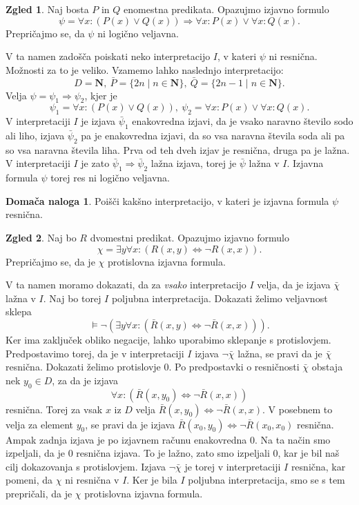 \documentclass[11pt]{book}
\def\NN{\mathbf{N}}
\theoremstyle{definition}
\theoremstyle{zgled}
\newtheorem*{zgled}{Zgled}
\theoremstyle{odprtproblem}
\theoremstyle{domacanaloga}
\newtheorem*{domacanaloga}{Domača naloga}
\theoremstyle{izrek}
\begin{document}
\begin{zgled}
Naj bosta $P$ in $Q$ enomestna predikata. Opazujmo izjavno formulo
\[
    \psi = \forall x \colon (P(x) \lor Q(x)) \Rightarrow \forall x \colon P(x) \lor \forall x \colon Q(x).
\]
Prepričajmo se, da $\psi$ ni logično veljavna.

V ta namen zadošča poiskati neko interpretacijo $I$, v kateri $\psi$ ni resnična. Možnosti za to je veliko. Vzamemo lahko naslednjo interpretacijo:
\[
    D = \NN, \ \bar P = \{ 2 n \mid n \in \NN \}, \ \bar Q = \{ 2n - 1 \mid n \in \NN \}.
\]
Velja $\psi = \psi_1 \Rightarrow \psi_2$, kjer je 
\[
    \psi_1 = \forall x \colon (P(x) \lor Q(x)), \
    \psi_2 = \forall x \colon P(x) \lor \forall x \colon Q(x).
\]
V interpretaciji $I$ je izjava $\bar \psi_1$ enakovredna izjavi, da je vsako naravno število sodo ali liho, izjava $\bar \psi_2$ pa je enakovredna izjavi, da so vsa naravna števila soda ali pa so vsa naravna števila liha. Prva od teh dveh izjav je resnična, druga pa je lažna. V interpretaciji $I$ je zato $\bar \psi_1 \Rightarrow \bar \psi_2$ lažna izjava, torej je $\bar\psi$ lažna v $I$. Izjavna formula $\psi$ torej res ni logično veljavna.

\begin{domacanaloga}
    Poišči kakšno interpretacijo, v kateri je izjavna formula $\psi$ resnična.
\end{domacanaloga}
\end{zgled}

\begin{zgled}
Naj bo $R$ dvomestni predikat. Opazujmo izjavno formulo
\[
    \chi = \exists y \forall x \colon (R(x,y) \Leftrightarrow \lnot R(x,x)).
\]
Prepričajmo se, da je $\chi$ protislovna izjavna formula.

V ta namen moramo dokazati, da za \emph{vsako} interpretacijo $I$ velja, da je izjava $\bar \chi$ lažna v $I$. Naj bo torej $I$ poljubna interpretacija. Dokazati želimo veljavnost sklepa
\[
  \models \lnot \left( \exists y \forall x \colon (\bar R(x,y) \Leftrightarrow \lnot \bar R(x,x)) \right).
\]
Ker ima zaključek obliko negacije, lahko uporabimo sklepanje s protislovjem. Predpostavimo torej, da je v interpretaciji $I$ izjava $\lnot \bar \chi$ lažna, se pravi da je $\bar \chi$ resnična. Dokazati želimo protislovje $0$. Po predpostavki o resničnosti $\bar \chi$ obstaja nek $y_0 \in D$, za da je izjava 
\[
    \forall x \colon (\bar R(x, y_0) \Leftrightarrow \lnot \bar R(x,x))
\]
resnična. Torej za vsak $x$ iz $D$ velja $\bar R(x, y_0) \Leftrightarrow \lnot \bar R(x,x)$. V posebnem to velja za element $y_0$, se pravi da je izjava $\bar R(x_0, y_0) \Leftrightarrow \lnot \bar R(x_0,x_0)$ resnična. Ampak zadnja izjava je po izjavnem računu enakovredna $0$. Na ta način smo izpeljali, da je $0$ resnična izjava. To je lažno, zato smo izpeljali $0$, kar je bil naš cilj dokazovanja s protislovjem. Izjava $\lnot \bar \chi$ je torej v interpretaciji $I$ resnična, kar pomeni, da $\chi$ ni resnična v $I$. Ker je bila $I$ poljubna interpretacija, smo se s tem prepričali, da je $\chi$ protislovna izjavna formula.
\end{zgled}
\end{document}
